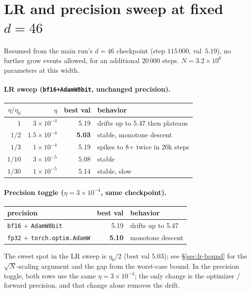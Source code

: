 \documentclass{article}
\begin{document}
\section{LR and precision sweep at fixed $d=46$}
\label{app:lr-sweep}
Resumed from the main run's $d=46$ checkpoint (step $115\,000$,
val~$5.19$), no further grow events allowed, for an additional
$20\,000$ steps.  $N=3.2\!\times\!10^{6}$ parameters at this width.

\paragraph{LR sweep (\texttt{bf16+AdamW8bit}, unchanged precision).}
\begin{center}
\begin{tabular}{rrr l}
\toprule
$\eta/\eta_0$ & $\eta$ & best val & behavior \\
\midrule
$1$       & $3{\times}10^{-4}$  & 5.19 & drifts up to 5.47 then plateaus \\
$1/2$     & $1.5{\times}10^{-4}$& \textbf{5.03} & stable, monotone descent \\
$1/3$     & $1{\times}10^{-4}$  & 5.19 & spikes to 8+ twice in 20k steps \\
$1/10$    & $3{\times}10^{-5}$  & 5.08 & stable \\
$1/30$    & $1{\times}10^{-5}$  & 5.14 & stable, slow \\
\bottomrule
\end{tabular}
\end{center}

\paragraph{Precision toggle ($\eta = 3{\times}10^{-4}$, same checkpoint).}
\begin{center}
\begin{tabular}{l r l}
\toprule
precision & best val & behavior \\
\midrule
\texttt{bf16} + \texttt{AdamW8bit} & 5.19 & drifts up to 5.47 \\
\texttt{fp32} + \texttt{torch.optim.AdamW} & \textbf{5.10} & monotone descent \\
\bottomrule
\end{tabular}
\end{center}

The sweet spot in the LR sweep is $\eta_0/2$ (best val $5.03$); see
\S\ref{sec:lr-bound} for the $\sqrt{N}$-scaling argument and the
gap from the worst-case bound.  In the precision toggle, both rows
use the same $\eta = 3{\times}10^{-4}$; the only change is the
optimizer / forward precision, and that change alone removes the
drift.
\end{document}
